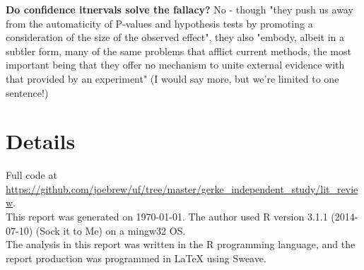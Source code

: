 \documentclass[11pt]{article}
\begin{document}
\begin{multicols}{2}
\noindent \textbf{Do confidence itnervals solve the fallacy?} No - though "they push us away from the automaticity of P-values and hypothesis tests by promoting a consideration of the size of the observed effect", they also "embody, albeit in a subtler form, many of the same problems that afflict current methods, the most important being that they offer no mechanism to unite external evidence with that provided by an experiment" (I would say more, but we're limited to one sentence!)





\end{multicols}
\newpage



\section*{Details}
\hrulefill

\vspace{10mm}
Full code at \href{https://github.com/joebrew/uf/tree/master/gerke\_independent\_study/lit\_review}{https://github.com/joebrew/uf/tree/master/gerke\_independent\_study/lit\_review}. \\

This report was generated on \today.  The author used R version 3.1.1 (2014-07-10) (Sock it to Me) on a mingw32 OS.  \\

The analysis in this report was written in the R programming language, and the report production was programmed in \LaTeX{} using Sweave.\\
\end{document}
